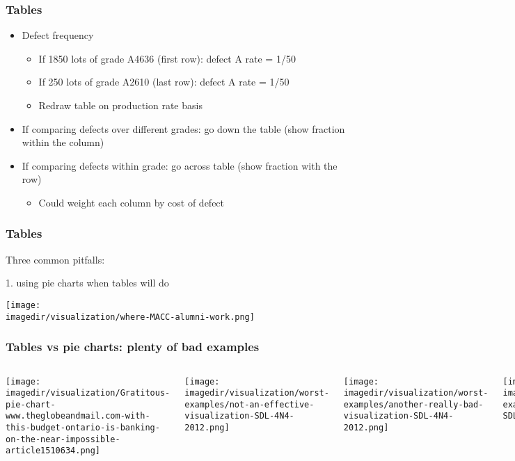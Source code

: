 \begin{frame}\frametitle{Tables}
	\begin{itemize}
		\item	Defect frequency 
		\begin{itemize}
			\item	If 1850 lots of grade A4636 (first row): defect A rate = 1/50 
			\item	If 250 lots of grade A2610 (last row): defect A rate = 1/50 
			\item	Redraw table on production rate basis 
		\end{itemize}
		\item	If comparing defects over different grades: go down the table (show fraction within the column) 
		\item	If comparing defects within grade: go across table (show fraction with the row) 
		\begin{itemize}
			\item	Could weight each column by cost of defect 
		\end{itemize}
	\end{itemize}
\end{frame}

\begin{frame}\frametitle{Tables}
	Three common pitfalls:
	
	1. using pie charts when tables will do 
	\begin{center}
		\texttt{[image: \\imagedir/visualization/where-MACC-alumni-work.png]}
	\end{center}
\end{frame}

\begin{frame}\frametitle{Tables vs pie charts: plenty of bad examples}
	\begin{columns}[t]
			\begin{center}
				\texttt{[image: \\imagedir/visualization/Gratitous-pie-chart-www.theglobeandmail.com-with-this-budget-ontario-is-banking-on-the-near-impossible-article1510634.png]}
			\end{center}
			\begin{center}
				\texttt{[image: \\imagedir/visualization/worst-examples/not-an-effective-visualization-SDL-4N4-2012.png]}
			\end{center}
			\begin{center}
				\texttt{[image: \\imagedir/visualization/worst-examples/another-really-bad-visualization-SDL-4N4-2012.png]}
			\end{center}
			\begin{center}
				\texttt{[image: \\imagedir/visualization/worst-examples/idiotic-pie-chart-SDL-4N4-2012.png]}
			\end{center}
	\end{columns}
\end{frame}

